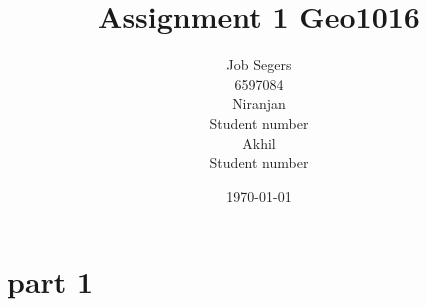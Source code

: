 \documentclass[a4paper,11pt]{scrartcl}
\title{Assignment 1 Geo1016}
\author{Job Segers\\ 6597084 \\ Niranjan \\ Student number \\ Akhil \\ Student number}
\date{\today}
\begin{document}
\maketitle

\section{part 1}
\end{document}
